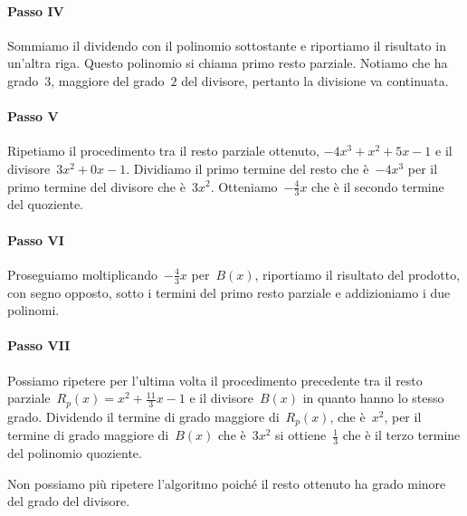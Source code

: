 \begin{exrig}
\begin{esempio}
\paragraph{Passo IV}
 Sommiamo il dividendo con il polinomio sottostante e riportiamo il risultato in un'altra riga. Questo polinomio si chiama primo resto parziale.
 Notiamo che ha grado~$3$, maggiore del grado~$2$ del divisore, pertanto la divisione va continuata.

\begin{center}
 
\end{center}
\paragraph{Passo V}
 Ripetiamo il procedimento tra il resto parziale ottenuto, $-4x^{3}+x^{2}+5x-1$ e il divisore~$3x^{2}+0x-1$. Dividiamo il primo termine del resto che
 è~$-4x^{3}$ per il primo termine del divisore che è~$3x^{2}$. Otteniamo~$-{\frac{4}{3}}x$ che è il secondo termine del quoziente.
\begin{center}
 
\end{center}
\paragraph{Passo VI}
 Proseguiamo moltiplicando~$-{\frac{4}{3}}x$ per~$B(x)$, riportiamo il risultato del prodotto, con segno opposto, sotto i
 termini del primo resto parziale e addizioniamo i due polinomi.
\begin{center}
 
\end{center}
\paragraph{Passo VII}
 Possiamo ripetere per l'ultima volta il procedimento precedente tra il resto parziale~$R_{p}(x)=x^{2}+\frac{11}{3}x-1$ e
 il divisore~$B(x)$ in quanto hanno lo stesso grado. Dividendo il termine di grado maggiore di~$R_{p}(x)$, che è~$x^{2}$,
 per il termine di grado maggiore di~$B(x)$ che è~$3x^{2}$ si ottiene~$\frac{1}{3}$ che è il terzo termine del polinomio quoziente.
\begin{center}
 
\end{center}

Non possiamo più ripetere l'algoritmo poiché il resto ottenuto ha grado minore del grado del divisore.


\end{esempio}
\end{exrig}
